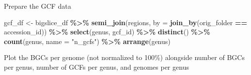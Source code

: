 \documentclass[
]{article}
\newenvironment{Shaded}{\begin{snugshade}}{\end{snugshade}}
\newcommand{\AttributeTok}[1]{\textcolor[rgb]{0.13,0.29,0.53}{#1}}
\newcommand{\FunctionTok}[1]{\textcolor[rgb]{0.13,0.29,0.53}{\textbf{#1}}}
\newcommand{\NormalTok}[1]{#1}
\newcommand{\OtherTok}[1]{\textcolor[rgb]{0.56,0.35,0.01}{#1}}
\newcommand{\SpecialCharTok}[1]{\textcolor[rgb]{0.81,0.36,0.00}{\textbf{#1}}}
\newcommand{\StringTok}[1]{\textcolor[rgb]{0.31,0.60,0.02}{#1}}
\begin{document}
Prepare the GCF data

\begin{Shaded}
\begin{Highlighting}[]
\NormalTok{gcf\_df }\OtherTok{\textless{}{-}}\NormalTok{ bigslice\_df }\SpecialCharTok{\%\textgreater{}\%}
  \FunctionTok{semi\_join}\NormalTok{(regions, }\AttributeTok{by =} \FunctionTok{join\_by}\NormalTok{(orig\_folder }\SpecialCharTok{==}\NormalTok{ accession\_id)) }\SpecialCharTok{\%\textgreater{}\%}
  \FunctionTok{select}\NormalTok{(genus, gcf\_id) }\SpecialCharTok{\%\textgreater{}\%}
  \FunctionTok{distinct}\NormalTok{() }\SpecialCharTok{\%\textgreater{}\%}
  \FunctionTok{count}\NormalTok{(genus, }\AttributeTok{name =} \StringTok{"n\_gcfs"}\NormalTok{) }\SpecialCharTok{\%\textgreater{}\%} \FunctionTok{arrange}\NormalTok{(genus)}
\end{Highlighting}
\end{Shaded}

Plot the BGCs per genome (not normalized to 100\%) alongside number of
BGCs per genus, number of GCFs per genus, and genomes per genus
\end{document}
